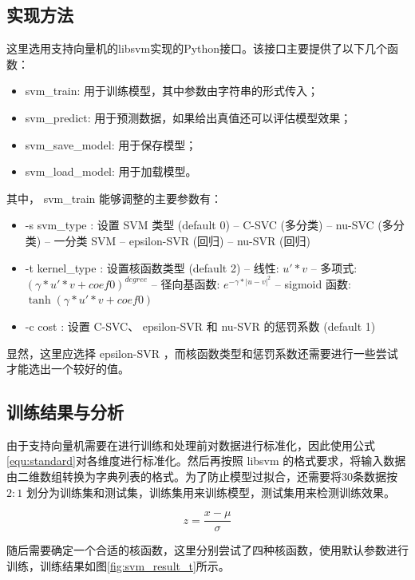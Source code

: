 \documentclass[a4paper]{article}
\begin{document}
		\subsection{实现方法}
			这里选用支持向量机的libsvm实现的Python接口。该接口主要提供了以下几个函数：
			\begin{itemize}
				\item svm\_train: 用于训练模型，其中参数由字符串的形式传入；
				\item svm\_predict: 用于预测数据，如果给出真值还可以评估模型效果；
				\item svm\_save\_model: 用于保存模型；
				\item svm\_load\_model: 用于加载模型。
			\end{itemize}
			其中， svm\_train 能够调整的主要参数有：
			\begin{itemize}\setlength{\itemsep}{0pt}
				\item -s svm\_type : 设置 SVM 类型 (default 0)
				 -- C-SVC		(多分类)
				 -- nu-SVC	(多分类)
				 -- 一分类 SVM
				 -- epsilon-SVR	(回归)
				 -- nu-SVR		(回归)
				\item -t kernel\_type : 设置核函数类型 (default 2)
				 -- 线性: $u'*v$
				 -- 多项式: $(\gamma * u' * v + coef0)^{degree}$
				 -- 径向基函数: $e^{-\gamma * \left|u-v\right|^2}$
				 -- sigmoid 函数: $\tanh(\gamma * u' * v+coef0)$
				\item -c cost : 设置 C-SVC、 epsilon-SVR 和 nu-SVR 的惩罚系数 (default 1)
			\end{itemize}

			显然，这里应选择 epsilon-SVR ，而核函数类型和惩罚系数还需要进行一些尝试才能选出一个较好的值。
			
		\subsection{训练结果与分析}
			由于支持向量机需要在进行训练和处理前对数据进行标准化，因此使用公式\eqref{equ:standard}对各维度进行标准化。然后再按照 libsvm 的格式要求，将输入数据由二维数组转换为字典列表的格式。为了防止模型过拟合，还需要将30条数据按 $2:1$ 划分为训练集和测试集，训练集用来训练模型，测试集用来检测训练效果。
			
			\begin{equation}\label{equ:standard}
				z = \frac{x - \mu}{\sigma}
			\end{equation}
			
			随后需要确定一个合适的核函数，这里分别尝试了四种核函数，使用默认参数进行训练，训练结果如图\ref{fig:svm_result_t}所示。
			
\end{document}
